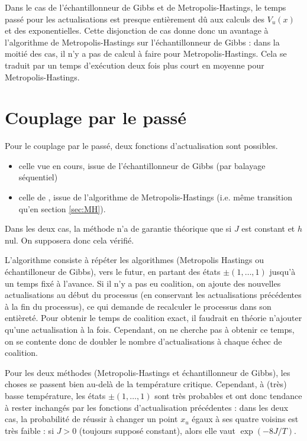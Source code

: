 \documentclass[a4paper,11pt]{article}
\begin{document}
Dans le cas de l'échantillonneur de Gibbs et de Metropolis-Hastings, le temps passé pour les actualisations est presque entièrement dû aux calculs des $V_u(x)$ et des exponentielles. Cette disjonction de cas donne donc un avantage à l'algorithme de Metropolis-Hastings sur l'échantillonneur de Gibbs : dans la moitié des cas, il n'y a pas de calcul à faire pour Metropolis-Hastings. Cela se traduit par un temps d'exécution deux fois plus court en moyenne pour Metropolis-Hastings.

\section{Couplage par le passé}\label{sec:coupling}

Pour le couplage par le passé, deux fonctions d'actualisation sont possibles. 
\begin{itemize}
	\item celle vue en cours, issue de l'échantillonneur de Gibbs (par balayage séquentiel)
	\item celle de \cite{propp1998coupling}, issue de l'algorithme de Metropolis-Hastings (i.e. même transition qu'en section \ref{sec:MH}).
\end{itemize}
Dans les deux cas, la méthode n'a de garantie théorique que si $J$ est constant et $h$ nul. On supposera donc cela vérifié.

L'algorithme consiste à répéter les algorithmes (Metropolis Hastings ou échantilloneur de Gibbs), vers le futur, en partant des états $\pm(1,\hdots,1)$  jusqu'à un temps fixé à l'avance. Si il n'y a pas eu coalition, on ajoute des nouvelles actualisations au début du processus (en conservant les actualisations précédentes à la fin du processus), ce qui demande de recalculer le processus dans son entièreté. Pour obtenir le temps de coalition exact, il faudrait en théorie n'ajouter qu'une actualisation à la fois. Cependant, on ne cherche pas à obtenir ce temps, on se contente donc de doubler le nombre d'actualisations à chaque échec de coalition.

Pour les deux méthodes (Metropolis-Hastings et échantillonneur de Gibbs), les choses se passent bien au-delà de la température critique. Cependant, à (très) basse température, les états $\pm(1,\hdots,1)$ sont très probables et ont donc tendance à rester inchangés par les fonctions d'actualisation précédentes : dans les deux cas, la probabilité de réussir à changer un point $x_u$ égaux à ses quatre voisins est très faible : si $J>0$ (toujours supposé constant), alors elle vaut $\exp(-8 J/T)$.
\end{document}

